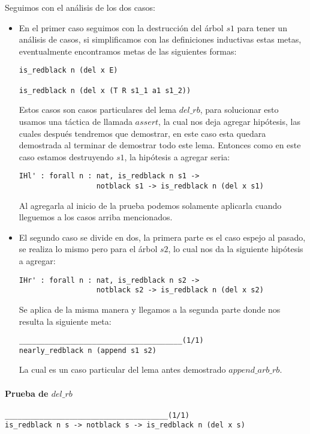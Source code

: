 Seguimos con el análisis de los dos casos:
\begin{itemize}
  \item En el primer caso seguimos con la destrucci\'on del \'arbol $s1$ para tener un análisis de
  casos, si simplificamos con las definiciones inductivas estas metas, eventualmente encontramos
  metas de las siguientes formas:
\begin{verbatim}
is_redblack n (del x E)

is_redblack n (del x (T R s1_1 a1 s1_2))
\end{verbatim}
  Estos casos son casos particulares del lema $del\_rb$, para solucionar esto usamos una táctica de
  {\coq} llamada $assert$, la cual nos deja agregar hip\'otesis, las cuales después tendremos que
  demostrar, en este caso esta quedara demostrada al terminar de demostrar todo este lema.
  Entonces como en este caso estamos destruyendo $s1$, la hip\'otesis a agregar seria:
\begin{verbatim}
IHl' : forall n : nat, is_redblack n s1 ->
                  notblack s1 -> is_redblack n (del x s1)
\end{verbatim}
  Al agregarla al inicio de la prueba podemos solamente aplicarla cuando lleguemos a los casos
  arriba mencionados.
  \item El segundo caso se divide en dos, la primera parte es el caso espejo al pasado, se realiza lo mismo pero para el \'arbol $s2$, lo cual nos da la siguiente hipótesis a agregar:
\begin{verbatim}
IHr' : forall n : nat, is_redblack n s2 ->
                  notblack s2 -> is_redblack n (del x s2)
\end{verbatim}
  Se aplica de la misma manera y llegamos a la segunda parte donde nos resulta la siguiente meta:
\begin{verbatim}
______________________________________(1/1)
nearly_redblack n (append s1 s2)
\end{verbatim}
  La cual es un caso particular del lema antes demostrado $append\_arb\_rb$.
\end{itemize}

\paragraph{Prueba de $del\_rb$}

\begin{verbatim}
______________________________________(1/1)
is_redblack n s -> notblack s -> is_redblack n (del x s)
\end{verbatim}

